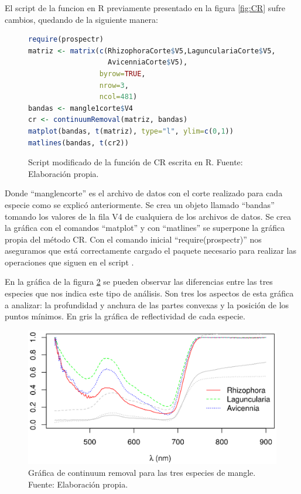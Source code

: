 El script de la funcion en R previamente presentado en la figura \ref{fig:CR} sufre cambios, quedando de la siguiente manera:\SmallSep

\begin{figure}[ht]
	\centering
	\begin{lstlisting}[language = R, frame = single]
require(prospectr)
matriz <- matrix(c(RhizophoraCorte$V5,LagunculariaCorte$V5,
                   AvicenniaCorte$V5),
                 byrow=TRUE,
                 nrow=3,
                 ncol=481)
bandas <- mangle1corte$V4
cr <- continuumRemoval(matriz, bandas)
matplot(bandas, t(matriz), type="l", ylim=c(0,1))
matlines(bandas, t(cr2))
	\end{lstlisting}
	\caption[Función modificada de CR]{Script modificado de la función de CR escrita en R. Fuente: Elaboración propia.}
	\label{fig:CRmodificado}
\end{figure}	

Donde ``manglencorte'' es el archivo de datos con el corte realizado para cada especie como se explicó anteriormente. Se crea un objeto llamado ``bandas'' tomando los valores de la fila V4 de cualquiera de los archivos de datos. Se crea la gráfica con el comandos ``matplot'' y con ``matlines'' se superpone la gráfica propia del método \ac{CR}. Con el comando inicial ``require(prospectr)'' nos aseguramos que está correctamente cargado el paquete necesario para realizar las operaciones que siguen en el script \citep{stevens2014introduction}. \Sep

En la gráfica de la figura \ref{fig:GraficaCR} se pueden observar las diferencias entre las tres especies que nos indica este tipo de análisis. Son tres los aspectos de esta gráfica a analizar: la profundidad y anchura de las partes convexas y la posición de los puntos mínimos. En gris la gráfica de reflectividad de cada especie.\Sep

\begin{figure}
	\centering
	\includegraphics[width=0.8\linewidth]{./Imagenes/ContinuumR2.eps}
	\caption[Gráfica de Continuum Removal]{Gráfica de continuum removal para las tres especies de mangle. Fuente: Elaboración propia.}
	\label{fig:GraficaCR}
\end{figure}


